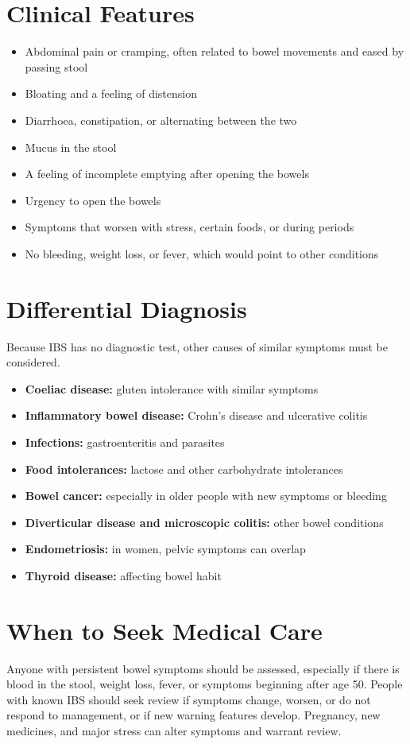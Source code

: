 \section*{Clinical Features}
\begin{itemize}
    \item Abdominal pain or cramping, often related to bowel movements and eased by passing stool
    \item Bloating and a feeling of distension
    \item Diarrhoea, constipation, or alternating between the two
    \item Mucus in the stool
    \item A feeling of incomplete emptying after opening the bowels
    \item Urgency to open the bowels
    \item Symptoms that worsen with stress, certain foods, or during periods
    \item No bleeding, weight loss, or fever, which would point to other conditions
\end{itemize}

\section*{Differential Diagnosis}
Because IBS has no diagnostic test, other causes of similar symptoms must be considered.
\begin{itemize}
    \item \textbf{Coeliac disease:} gluten intolerance with similar symptoms
    \item \textbf{Inflammatory bowel disease:} Crohn's disease and ulcerative colitis
    \item \textbf{Infections:} gastroenteritis and parasites
    \item \textbf{Food intolerances:} lactose and other carbohydrate intolerances
    \item \textbf{Bowel cancer:} especially in older people with new symptoms or bleeding
    \item \textbf{Diverticular disease and microscopic colitis:} other bowel conditions
    \item \textbf{Endometriosis:} in women, pelvic symptoms can overlap
    \item \textbf{Thyroid disease:} affecting bowel habit
\end{itemize}

\section*{When to Seek Medical Care}
Anyone with persistent bowel symptoms should be assessed, especially if there is blood in the stool, weight loss, fever, or symptoms beginning after age 50. People with known IBS should seek review if symptoms change, worsen, or do not respond to management, or if new warning features develop. Pregnancy, new medicines, and major stress can alter symptoms and warrant review.


